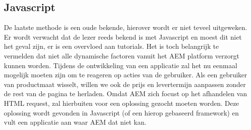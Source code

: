 
	\subsection{Javascript}
     De laatste methode is een oude bekende, hierover wordt er niet teveel uitgeweken. Er wordt verwacht dat de lezer reeds bekend is met Javascript en moest dit niet het geval zijn, er is een overvloed aan tutorials. Het is toch belangrijk te vermelden dat niet alle dynamische factoren vanuit het AEM platform verzorgt kunnen worden. Tijdens de ontwikkeling van een applicatie zal het nu eenmaal mogelijk moeten zijn om te reageren op acties van de gebruiker. Als een gebruiker van productmaat wisselt, willen we ook de prijs en levertermijn aanpassen zonder de rest van de pagina te herladen. Omdat AEM zich focust op het afhandelen van HTML request, zal hierbuiten voor een oplossing gezocht moeten worden. Deze oplossing wordt gevonden in Javascript (of een hierop gebaseerd framework) en vult een applicatie aan waar AEM dat niet kan.